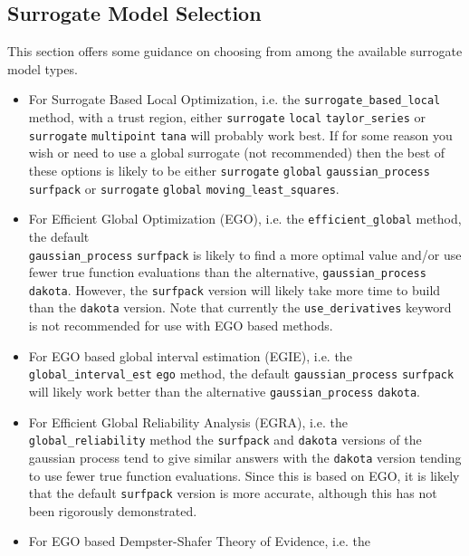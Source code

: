 \subsection{Surrogate Model Selection}

This section offers some guidance on choosing from among the available
surrogate model types.

\begin{itemize}
\item For Surrogate Based Local Optimization, i.e. the 
      \texttt{surrogate\_based\_local} method, with a trust region, either
      \texttt{surrogate} \texttt{local} \texttt{taylor\_series} or
      \texttt{surrogate} \texttt{multipoint} \texttt{tana} will probably 
      work best.  If for some reason you wish or need to use a global 
      surrogate (not recommended) then the best of these options is likely 
      to be either 
      \texttt{surrogate} \texttt{global} 
      \texttt{gaussian\_process} \texttt{surfpack} or
      \texttt{surrogate} \texttt{global} \texttt{moving\_least\_squares}.
\item For Efficient Global Optimization (EGO), i.e. the 
      \texttt{efficient\_global} method, the default\\
      \texttt{gaussian\_process} \texttt{surfpack}  
      is likely to find a more optimal value and/or use fewer true 
      function evaluations than the alternative,
      \texttt{gaussian\_process} \texttt{dakota}.  However, the 
      \texttt{surfpack} version will likely take more time to build 
      than the \texttt{dakota} version.  Note that currently the 
      \texttt{use\_derivatives} keyword is not recommended for use with
      EGO based methods.
\item For EGO based global interval estimation (EGIE), i.e. the 
      \texttt{global\_interval\_est} \texttt{ego} method, 
      the default \texttt{gaussian\_process} \texttt{surfpack} will
      likely work better than the alternative \texttt{gaussian\_process} 
      \texttt{dakota}.
\item For Efficient Global Reliability Analysis (EGRA), i.e. the 
      \texttt{global\_reliability} method the \texttt{surfpack} and 
      \texttt{dakota} versions of the gaussian process tend to give 
      similar answers with the \texttt{dakota} version tending to use
      fewer true function evaluations.  Since this is based on EGO, it
      is likely that the default \texttt{surfpack} version is more 
      accurate, although this has not been rigorously demonstrated.
\item For EGO based Dempster-Shafer Theory of Evidence, i.e. the 

\end{itemize}
